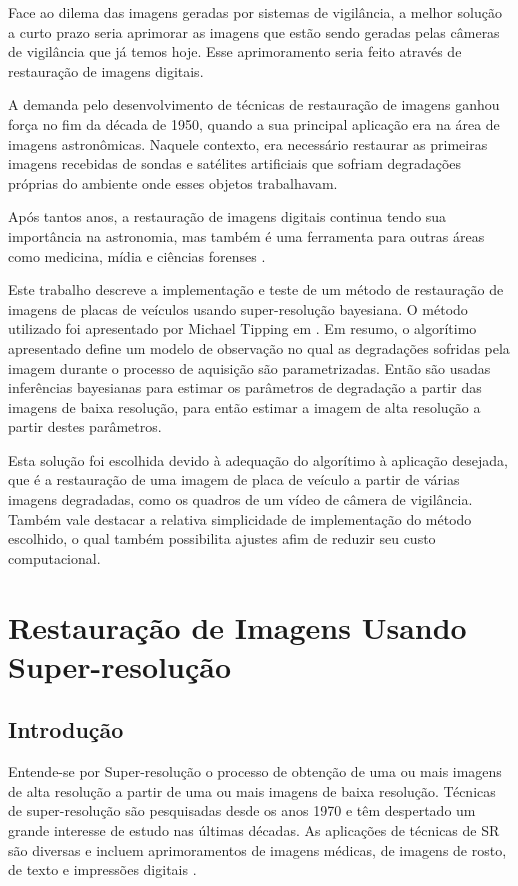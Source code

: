 \documentclass[12pt,openright,oneside,a4paper,english,brazil]{abntex2}
\begin{document}
Face ao dilema das imagens geradas por sistemas de vigilância,
a melhor solução a curto prazo seria aprimorar as imagens que estão sendo geradas pelas câmeras de vigilância que já temos hoje.
Esse aprimoramento seria feito através de restauração de imagens digitais.

A demanda pelo desenvolvimento de técnicas de restauração de imagens ganhou força no fim da década de 1950, quando a sua principal aplicação era na área de imagens astronômicas.
Naquele contexto, era necessário restaurar as primeiras imagens recebidas de sondas e satélites artificiais que sofriam degradações próprias do ambiente onde esses objetos trabalhavam.

Após tantos anos, a restauração de imagens digitais continua tendo sua importância na astronomia, mas também é uma ferramenta para outras áreas como medicina, mídia e ciências forenses \cite{banham1997digital}.

Este trabalho descreve a implementação e teste de um método de restauração de imagens de placas de veículos usando super-resolução bayesiana.
O método utilizado foi apresentado por Michael Tipping em \cite{tipping2003bayesian}.
Em resumo, o algorítimo apresentado define um modelo de observação no qual as degradações sofridas pela imagem durante o processo de aquisição são parametrizadas.
Então são usadas inferências bayesianas para estimar os parâmetros de degradação a partir das imagens de baixa resolução, para então estimar a imagem de alta resolução a partir destes parâmetros.

Esta solução foi escolhida devido à adequação do algorítimo à aplicação desejada, que é a restauração de uma imagem de placa de veículo a partir de várias imagens degradadas, como os quadros de um vídeo de câmera de vigilância.
Também vale destacar a relativa simplicidade de implementação do método escolhido, o qual também possibilita ajustes afim de reduzir seu custo computacional.


\chapter{Restauração de Imagens Usando Super-resolução}
\section{Introdução}
Entende-se por Super-resolução o processo de obtenção de uma ou mais imagens de alta resolução a partir de uma ou mais imagens de baixa resolução.
Técnicas de super-resolução são pesquisadas desde os anos 1970 e têm despertado um grande interesse de estudo nas últimas décadas.
As aplicações de técnicas de SR são diversas e incluem aprimoramentos de imagens médicas, de imagens de rosto, de texto e impressões digitais \cite{nasrollahi2014super}.
\end{document}
